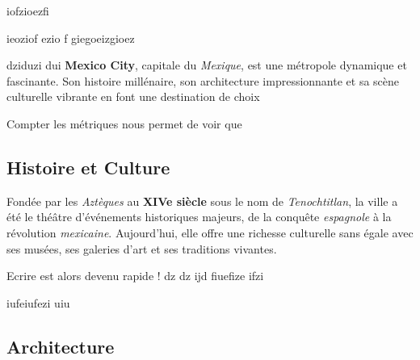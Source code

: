 \documentclass[12pt, a4paper]{article}
\begin{document}
iofzioezfi

ieoziof ezio f
giegoeizgioez



dziduzi dui 
\textbf{Mexico City}, capitale du \textit{Mexique}, est une métropole dynamique et fascinante. Son histoire millénaire, son architecture impressionnante et sa scène culturelle vibrante en font une destination de choix

Compter les métriques nous permet de voir que 
\subsection*{\textbf{Histoire et Culture}}

Fondée par les \textit{Aztèques} au \textbf{XIVe siècle} sous le nom de \textit{Tenochtitlan}, la ville a été le théâtre d'événements historiques majeurs, de la conquête \textit{espagnole} à la révolution \textit{mexicaine}. Aujourd'hui, elle offre une richesse culturelle sans égale avec ses musées, ses galeries d'art et ses traditions vivantes.

Ecrire est alors devenu rapide !
dz dz ijd
 fiuefize ifzi

iufeiufezi
uiu


\subsection*{\textbf{Architecture}}
\end{document}
